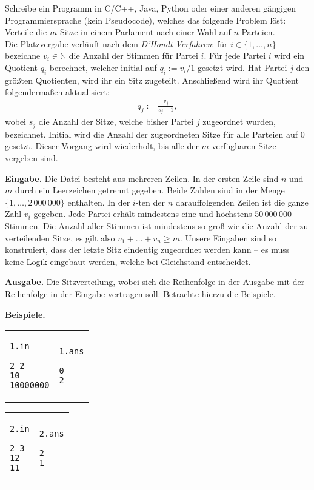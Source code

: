 \documentclass{uebung_cs}
\begin{document}
Schreibe ein Programm in C/C++, Java, Python oder einer anderen gängigen Programmiersprache (kein Pseudocode), welches das folgende Problem löst: 
Verteile die $m$ Sitze in einem Parlament nach einer Wahl auf $n$ Parteien.\\[0.25cm]
Die Platzvergabe verläuft nach dem \emph{D'Hondt-Verfahren}:
für $i \in \{1, \dots, n\}$ bezeichne $v_i \in \mathbb N$ die Anzahl der Stimmen für Partei $i$.
Für jede Partei $i$ wird ein Quotient $q_i$ berechnet, welcher initial auf $q_i := v_i/1$ gesetzt wird.
Hat Partei $j$ den größten Quotienten, wird ihr ein Sitz zugeteilt.
Anschließend wird ihr Quotient folgendermaßen aktualisiert:
\begin{align*}
    q_j := \frac{v_j}{s_j + 1},
\end{align*}
wobei $s_j$ die Anzahl der Sitze, welche bisher Partei $j$ zugeordnet wurden, bezeichnet.
Initial wird die Anzahl der zugeordneten Sitze für alle Parteien auf $0$ gesetzt.
Dieser Vorgang wird wiederholt, bis alle der $m$ verfügbaren Sitze vergeben sind.

\textbf{Eingabe.}
Die Datei besteht aus mehreren Zeilen.
In der ersten Zeile sind $n$ und $m$ durch ein Leerzeichen getrennt gegeben.
Beide Zahlen sind in der Menge $\{1, \dots, 2\,000\,000\}$ enthalten.
In der $i$-ten der $n$ darauffolgenden Zeilen ist die ganze Zahl $v_i$ gegeben.
Jede Partei erhält mindestens eine und höchstens 50\,000\,000 Stimmen.
Die Anzahl aller Stimmen ist mindestens so groß wie die Anzahl der zu verteilenden Sitze, es gilt also $v_1 + \dots + v_n \geq m$.
Unsere Eingaben sind so konstruiert, dass der letzte Sitz eindeutig zugeordnet werden kann -- es muss keine Logik eingebaut werden, welche bei Gleichstand entscheidet.

\textbf{Ausgabe.}
Die Sitzverteilung, wobei sich die Reihenfolge in der Ausgabe mit der Reihenfolge in der Eingabe vertragen soll. Betrachte hierzu die Beispiele.

\textbf{Beispiele.}\\
\begin{tabular}{p{}p{}}
\texttt{1.in}
\begin{verbatim}
2 2
10
10000000
\end{verbatim}
&
\texttt{1.ans}
\begin{verbatim}
0
2
\end{verbatim}
\end{tabular}

\begin{tabular}{p{}p{}}
\texttt{2.in}
\begin{verbatim}
2 3
12
11
\end{verbatim}
&
\texttt{2.ans}
\begin{verbatim}
2
1
\end{verbatim}
\end{tabular}
\end{document}
